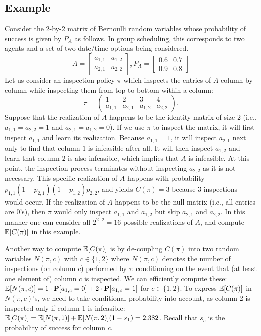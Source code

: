  \subsection{Example} \label{matrix:sec:example}
Consider the 2-by-2 matrix of Bernoulli random variables whose probability of success is given by $P_A$ as follows. In group scheduling, this corresponds to two agents and a set of two date/time options being considered.
 \begin{equation*}
 A = 
 	\begin{bmatrix}
 		a_{1,1}  & a_{1, 2} \\
 		a_{2,1}  & a_{2, 2}
 	\end{bmatrix},
 P_A = 
 	\begin{bmatrix}
 		0.6  & 0.7  \\
 		0.9  & 0.8 
 	\end{bmatrix}
 \end{equation*}
 Let us consider an inspection policy $\pi$ which inspects the entries of $A$ column-by-column while inspecting them from top to bottom within a column:
 \begin{equation*}
 	\pi = 
 	\begin{pmatrix} 
 	1 & 2 & 3 & 4  \\
 	a_{1,1} & a_{2,1} & a_{1,2} & a_{2,2} 
 	\end{pmatrix}.
 \end{equation*}	
 Suppose that the realization of $A$ happens to be the identity matrix of size $2$ (i.e., $a_{1,1} = a_{2,2} = 1$ and $a_{2,1} = a_{1,2} = 0$). If we use $\pi$ to inspect the matrix, it will first inspect $a_{1,1}$ and learn its realization. Because $a_{1,1} = 1$, it will inspect $a_{2,1}$ next only to find that column $1$ is infeasible after all. It will then inspect $a_{1,2}$ and learn that column $2$ is also infeasible, which implies that $A$ is infeasible. At this point, the inspection process terminates without inspecting $a_{2,2}$ as it is not necessary.
 This specific realization of $A$ happens with probability $p_{1,1}(1 - p_{2,1})(1-p_{1,2})p_{2,2}$, and yields $C(\pi) = 3$ because 3 inspections would occur. 
 If the realization of $A$ happens to be the null matrix (i.e., all entries are $0$'s), then $\pi$ would only inspect $a_{1,1}$ and $a_{1,2}$ but skip $a_{2,1}$ and $a_{2,2}$.  In this manner one can consider all $2^{2\cdot 2} = 16$ possible realizations of $A$, and compute $\mathbb{E}[C(\pi)]$ in this example. 

 Another way to compute $\mathbb{E}[C(\pi)]$ is by de-coupling $C(\pi)$ into two random variables $N(\pi, c)$ with $c\in\{1,2\}$ where $N(\pi,c)$ denotes the number of inspections (on column $c$) performed by $\pi$ conditioning on the event that (at least one element of) column $c$ is inspected.
 We can efficiently compute these: $\mathbb{E}[N(\pi, c)] = 1 \cdot \mathbf{P}[a_{1,c} = 0] + 2 \cdot \mathbf{P}[a_{1,c} = 1]$ for $c\in \{1, 2\}$.
 To express $\mathbb{E}[C(\pi)]$ in $N(\pi,c)$'s, we need to take conditional probability into account, as column 2 is inspected only if column 1 is infeasible: 
 $\mathbb{E}[C(\pi)] = \mathbb{E}[N(\pi,1)] + \mathbb{E}[N(\pi,2)] (1-s_1) = 2.382$. Recall that $s_c$ is the probability of success for column $c$.

